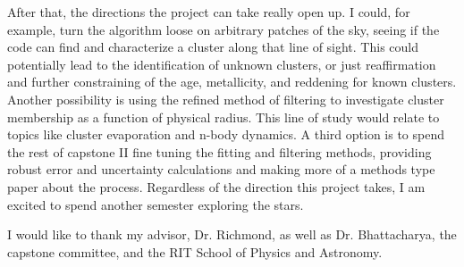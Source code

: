 \documentclass[aps,prb,twocolumn,groupedaddress,nofootinbib,floatfix]{revtex4-1}
\begin{document}
After that, the directions the project can take really open up. I could, for example, turn the algorithm loose on arbitrary patches of the sky, seeing if the code can find and characterize a cluster along that line of sight. This could potentially lead to the identification of unknown clusters, or just reaffirmation and further constraining of the age, metallicity, and reddening for known clusters. Another possibility is using the refined method of filtering to investigate cluster membership as a function of physical radius. This line of study would relate to topics like cluster evaporation and n-body dynamics. A third option is to spend the rest of capstone II fine tuning the fitting and filtering methods, providing robust error and uncertainty calculations and making more of a methods type paper about the process. Regardless of the direction this project takes, I am excited to spend another semester exploring the stars.

\begin{acknowledgments}
I would like to thank my advisor, Dr. Richmond, as well as Dr. Bhattacharya, the capstone committee, and the RIT School of Physics and Astronomy.
\end{acknowledgments}
%
%



\end{document}
